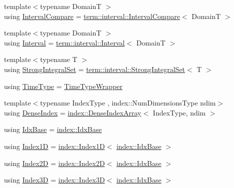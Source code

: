 \begin{DoxyCompactItemize}
\item 
{\footnotesize template$<$typename DomainT $>$ }\\using \hyperlink{namespacevt_ab51b754f1d22841f555246195fab9d41}{Interval\+Compare} = \hyperlink{structvt_1_1term_1_1interval_1_1_interval_compare}{term\+::interval\+::\+Interval\+Compare}$<$ DomainT $>$
\item 
{\footnotesize template$<$typename DomainT $>$ }\\using \hyperlink{namespacevt_a0036b5cb523aef3477d6d5de9d94eabb}{Interval} = \hyperlink{structvt_1_1term_1_1interval_1_1_interval}{term\+::interval\+::\+Interval}$<$ DomainT $>$
\item 
{\footnotesize template$<$typename T $>$ }\\using \hyperlink{namespacevt_aaefb2bd6d08c8dc0ff26ed43636611b1}{Strong\+Integral\+Set} = \hyperlink{structvt_1_1term_1_1interval_1_1_strong_integral_set}{term\+::interval\+::\+Strong\+Integral\+Set}$<$ T $>$
\item 
using \hyperlink{namespacevt_a2b9f28078dc309ad0706b69ded743e69}{Time\+Type} = \hyperlink{structvt_1_1_time_type_wrapper}{Time\+Type\+Wrapper}
\item 
{\footnotesize template$<$typename Index\+Type , index\+::\+Num\+Dimensions\+Type ndim$>$ }\\using \hyperlink{namespacevt_ac016d9c31465ce11c14eab2be11f9183}{Dense\+Index} = \hyperlink{structvt_1_1index_1_1_dense_index_array}{index\+::\+Dense\+Index\+Array}$<$ Index\+Type, ndim $>$
\item 
using \hyperlink{namespacevt_afb96657e28fa98eb685c5e0c6b1b122e}{Idx\+Base} = \hyperlink{namespacevt_1_1index_a0dbb8d47463da27c1436e8e4ddb02743}{index\+::\+Idx\+Base}
\item 
using \hyperlink{namespacevt_a5540efc78234273e1796fb003fe4d234}{Index1D} = \hyperlink{namespacevt_1_1index_a091a4f5a7a2c993d9727eaa60cf67d81}{index\+::\+Index1D}$<$ \hyperlink{namespacevt_1_1index_a0dbb8d47463da27c1436e8e4ddb02743}{index\+::\+Idx\+Base} $>$
\item 
using \hyperlink{namespacevt_a3bab786053b74a3d856fff1412ffa73a}{Index2D} = \hyperlink{namespacevt_1_1index_a8373801efc8343f24d6e8ba57df40a69}{index\+::\+Index2D}$<$ \hyperlink{namespacevt_1_1index_a0dbb8d47463da27c1436e8e4ddb02743}{index\+::\+Idx\+Base} $>$
\item 
using \hyperlink{namespacevt_a2c8053bc5f2df4934272542fb3e5a0bc}{Index3D} = \hyperlink{namespacevt_1_1index_a2c09a09f7346d370a0bcbbfb0d4459cd}{index\+::\+Index3D}$<$ \hyperlink{namespacevt_1_1index_a0dbb8d47463da27c1436e8e4ddb02743}{index\+::\+Idx\+Base} $>$

\end{DoxyCompactItemize}
